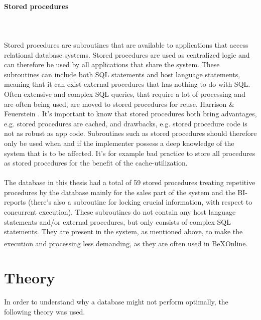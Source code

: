 \documentclass{cslthse-msc}
\newcommand{\bex}{BeX\textsuperscript{\textregistered}}
\begin{document}
\paragraph*{Stored procedures}\mbox{}\\\\ 
Stored procedures are subroutines that are available to applications that access relational database systems. Stored procedures are used as centralized logic and can therefore be used by all applications that share the system. These subroutines can include both SQL statements and host language statements, meaning that it can exist external procedures that has nothing to do with SQL. Often extensive and complex SQL queries, that require a lot of processing and are often being used, are moved to stored procedures for reuse, Harrison \& Feuerstein \cite{StoredProcedures}. It's important to know that stored procedures both bring advantages, e.g. stored procedures are cached, and drawbacks, e.g. stored procedure code is not as robust as app code. Subroutines such as stored procedures should therefore only be used when and if the implementer possess a deep knowledge of the system that is to be affected. It's for example bad practice to store all procedures as stored procedures for the benefit of the cache-utilization.\\\\
The database in this thesis had a total of 59 stored procedures treating repetitive procedures by the database mainly for the sales part of the system and the BI-reports (there's also a subroutine for locking crucial information, with respect to concurrent execution). These subroutines do not contain any host language statements and/or external procedures, but only consists of complex SQL statements. They are present in the system, as mentioned above, to make the execution and processing less demanding, as they are often used in \bex Online.

 
\section{Theory}\label{sec:theory}
In order to understand why a database might not perform optimally, the following theory was used.
\end{document}
